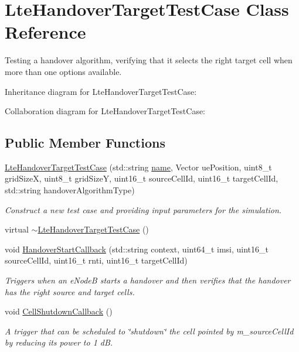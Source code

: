 \hypertarget{classLteHandoverTargetTestCase}{}\section{Lte\+Handover\+Target\+Test\+Case Class Reference}
\label{classLteHandoverTargetTestCase}


Testing a handover algorithm, verifying that it selects the right target cell when more than one options available.  




Inheritance diagram for Lte\+Handover\+Target\+Test\+Case\+:


Collaboration diagram for Lte\+Handover\+Target\+Test\+Case\+:
\subsection*{Public Member Functions}
\begin{DoxyCompactItemize}
\item 
\hyperlink{classLteHandoverTargetTestCase_a8beec32ed02017f79b6489bac98c39af}{Lte\+Handover\+Target\+Test\+Case} (std\+::string \hyperlink{generate__test__data__lte__spectrum__model_8m_ab74e6bf80237ddc4109968cedc58c151}{name}, Vector ue\+Position, uint8\+\_\+t grid\+SizeX, uint8\+\_\+t grid\+SizeY, uint16\+\_\+t source\+Cell\+Id, uint16\+\_\+t target\+Cell\+Id, std\+::string handover\+Algorithm\+Type)
\begin{DoxyCompactList}\small\item\em Construct a new test case and providing input parameters for the simulation. \end{DoxyCompactList}\item 
virtual \hyperlink{classLteHandoverTargetTestCase_aef73394d2533014c4cca8146aa82b530}{$\sim$\+Lte\+Handover\+Target\+Test\+Case} ()
\item 
void \hyperlink{classLteHandoverTargetTestCase_ab31897a3c0cc8ee5da3daab82e80be43}{Handover\+Start\+Callback} (std\+::string context, uint64\+\_\+t imsi, uint16\+\_\+t source\+Cell\+Id, uint16\+\_\+t rnti, uint16\+\_\+t target\+Cell\+Id)
\begin{DoxyCompactList}\small\item\em Triggers when an e\+NodeB starts a handover and then verifies that the handover has the right source and target cells. \end{DoxyCompactList}\item 
void \hyperlink{classLteHandoverTargetTestCase_a8f9888bfbd34dbc434be80c79a440669}{Cell\+Shutdown\+Callback} ()
\begin{DoxyCompactList}\small\item\em A trigger that can be scheduled to \char`\"{}shutdown\char`\"{} the cell pointed by {\ttfamily m\+\_\+source\+Cell\+Id} by reducing its power to 1 dB. \end{DoxyCompactList}\end{DoxyCompactItemize}
